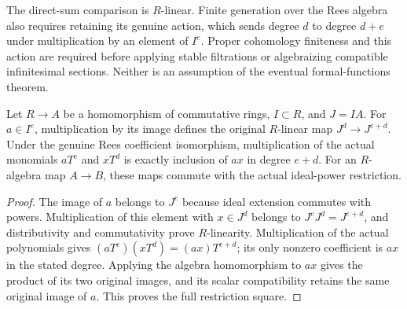 \begin{remark}
The direct-sum comparison is $R$-linear. Finite generation over the Rees
algebra also requires retaining its genuine action, which sends degree $d$
to degree $d+e$ under multiplication by an element of $I^e$. Proper
cohomology finiteness and this action are required before applying stable
filtrations or algebraizing compatible infinitesimal sections. Neither is
an assumption of the eventual formal-functions theorem.
\end{remark}

\begin{lemma}
\label{lem:fc-formal-functions-rees-multiplication}
\leanok
Let $R\to A$ be a homomorphism of commutative rings, $I\subset R$, and
$J=IA$. For $a\in I^e$, multiplication by its image defines the original
$R$-linear map $J^d\to J^{e+d}$. Under the genuine Rees coefficient
isomorphism, multiplication of the actual monomials $aT^e$ and $xT^d$
is exactly inclusion of $ax$ in degree $e+d$. For an $R$-algebra map
$A\to B$, these maps commute with the actual ideal-power restriction.
\end{lemma}
\begin{proof}
The image of $a$ belongs to $J^e$ because ideal extension commutes with
powers. Multiplication of this element with $x\in J^d$ belongs to
$J^eJ^d=J^{e+d}$, and distributivity and commutativity prove $R$-linearity.
Multiplication of the actual polynomials gives
$(aT^e)(xT^d)=(ax)T^{e+d}$; its only nonzero coefficient is $ax$ in the
stated degree. Applying the algebra homomorphism to $ax$ gives the
product of its two original images, and its scalar compatibility retains
the same original image of $a$. This proves the full restriction square.
\end{proof}

